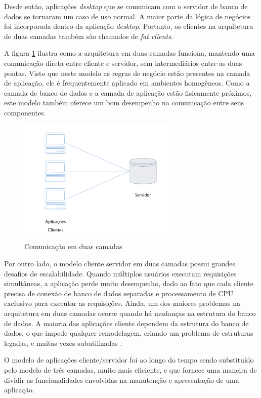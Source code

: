 Desde então, aplicações \textit{desktop} que se comunicam com o servidor de banco de dados se tornaram um caso de uso normal. A maior parte da lógica de negócios foi incorporada dentro da aplicação \textit{desktop}. Portanto, os clientes na arquitetura de duas camadas também são chamados de \textit{fat clients}.

A figura \ref{fig:two-tier} ilustra como a arquitetura em duas camadas funciona, mantendo uma comunicação direta entre cliente e servidor, sem intermediários entre as duas pontas. Visto que neste modelo as regras de negócio estão presentes na camada de aplicação, ele é frequentemente aplicado em ambientes homogêneos. Como a camada de banco de dados e a camada de aplicação estão fisicamente próximos, este modelo também oferece um bom desempenho na comunicação entre seus componentes.

\begin{figure}[htbp]
    \centering
    \includegraphics[width=0.7\textwidth]{figuras/client-server.png}
    \caption{Comunicação em duas camadas}
    \label{fig:two-tier}
\end{figure}

Por outro lado, o modelo cliente servidor em duas camadas possui grandes desafios de escalabilidade. Quando múltiplos usuários executam requisições simultâneas, a aplicação perde muito desempenho, dado ao fato que cada cliente precisa de conexão de banco de dados separadas e processamento de CPU exclusivo para executar as requisições. Ainda, um dos maiores problemas na arquitetura em duas camadas ocorre quando há mudanças na estrutura do banco de dados. A maioria das aplicações cliente dependem da estrutura do banco de dados, o que impede qualquer remodelagem, criando um problema de estruturas legadas, e muitas vezes subutilizadas \cite{two-tier-differences}.

O modelo de aplicações cliente/servidor foi ao longo do tempo sendo substituído pelo modelo de três camadas, muito mais eficiente, e que fornece uma maneira de dividir as funcionalidades envolvidas na manutenção e apresentação de uma aplicação.

